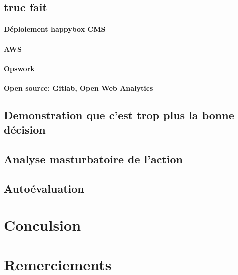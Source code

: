 \documentclass[11pt, a4paper ]{report}
\begin{document}
		\section{truc fait}	 %

			\subsubsection{Déploiement happybox CMS}
			\subsubsection{AWS}

			\subsubsection{Opswork}

			\subsubsection{Open source: Gitlab, Open Web Analytics}

		\section{Demonstration que c'est trop plus la bonne décision} %

		\section{Analyse masturbatoire de l'action} %

		\section{Autoévaluation}

	\chapter*{Conculsion} %

	\chapter*{Remerciements}

	\appendix
	\printindex
\end{document}
